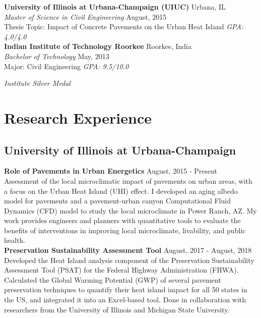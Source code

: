\documentclass[12pt]{article}
\begin{document}
\textbf{University of Illinois at Urbana-Champaign (UIUC)} \hfill Urbana, IL\\
\textit{Master of Science in Civil Engineering} \hfill August, 2015\\
Thesis Topic: Impact of Concrete Pavements on the Urban Heat Island \hfill \textit{GPA: 4.0/4.0} \\

\textbf{Indian Institute of Technology Roorkee} \hfill Roorkee, India\\
\textit{Bachelor of Technology} \hfill May, 2013\\
Major: Civil Engineering \hfill \textit{GPA: 9.5/10.0} \\
\strut \hfill \textit{Institute Silver Medal} \\ %

\section*{Research Experience}
\subsection*{University of Illinois at Urbana-Champaign}
\textbf{Role of Pavements in Urban Energetics} \hfill August, 2015 - Present \\
Assessment of the local microclimatic impact of pavements on urban areas, with a focus on the Urban Heat Island (UHI) effect. I developed an aging albedo model for pavements and a pavement-urban canyon Computational Fluid Dynamics (CFD) model to study the local microclimate in Power Ranch, AZ. My work provides engineers and planners with quantitative tools to evaluate the benefits of interventions in improving local microclimate, livability, and public health.\\

\textbf{Preservation Sustainability Assessment Tool} \hfill August, 2017 - August, 2018\\
Developed the Heat Island analysis component of the Preservation Sustainability Assessment Tool (PSAT) for the Federal Highway Administration (FHWA). Calculated the Global Warming Potential (GWP) of several pavement preservation techniques to quantify their heat island impact for all 50 states in the US, and integrated it into an Excel-based tool. Done in collaboration with researchers from the University of Illinois and Michigan State University. \\
\end{document}
